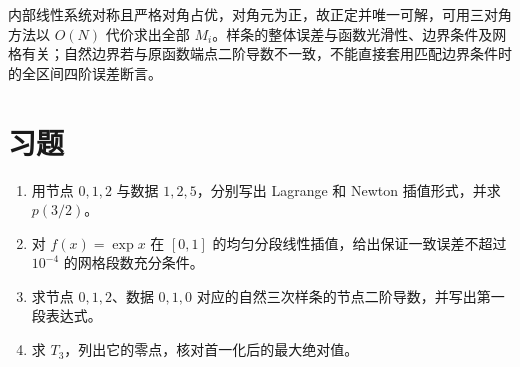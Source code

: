 内部线性系统对称且严格对角占优，对角元为正，故正定并唯一可解，可用三对角方法以 $O(N)$ 代价求出全部 $M_i$。样条的整体误差与函数光滑性、边界条件及网格有关；自然边界若与原函数端点二阶导数不一致，不能直接套用匹配边界条件时的全区间四阶误差断言。

\section{习题}
\begin{enumerate}[label=\arabic*.]
\item\label{exr:na-interp-poly} 用节点 $0,1,2$ 与数据 $1,2,5$，分别写出 Lagrange 和 Newton 插值形式，并求 $p(3/2)$。
\item\label{exr:na-interp-error} 对 $f(x)=\exp x$ 在 $[0,1]$ 的均匀分段线性插值，给出保证一致误差不超过 $10^{-4}$ 的网格段数充分条件。
\item\label{exr:na-interp-spline} 求节点 $0,1,2$、数据 $0,1,0$ 对应的自然三次样条的节点二阶导数，并写出第一段表达式。
\item\label{exr:na-interp-cheb} 求 $T_3$，列出它的零点，核对首一化后的最大绝对值。
\end{enumerate}

